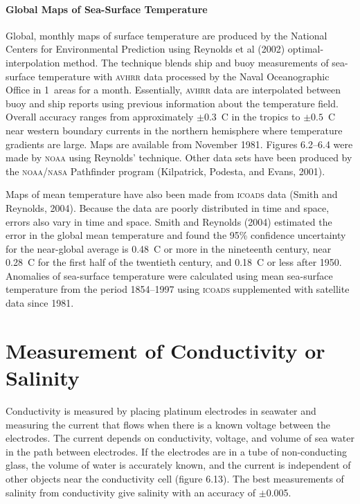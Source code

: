 \paragraph{Global Maps of Sea-Surface Temperature}
Global, monthly maps of surface
temperature are produced by the National Centers for Environmental
Prediction using Reynolds et al (2002) optimal-interpolation
method. The technique blends ship and buoy measurements of sea-surface
temperature with \textsc{avhrr} data processed by the Naval Oceanographic Office
in 1\degrees\ areas for a month. Essentially, \textsc{avhrr} data are
interpolated between buoy and ship reports using previous information
about the temperature field. Overall
accuracy ranges from
approximately $\pm 0.3$\degrees\ C in the tropics to $\pm
0.5$\degrees\ C near western boundary currents in the northern
hemisphere where temperature gradients are large.  Maps are available
from November 1981. Figures 6.2--6.4 were made by \textsc{noaa} using
Reynolds' technique. Other data sets have been produced by the
\textsc{noaa/nasa} Pathfinder program (Kilpatrick, Podesta, and Evans,
2001).

Maps of mean temperature have also been made from \textsc{icoads}
data (Smith and Reynolds, 2004). Because the data are poorly
distributed in time and space, errors also vary in time and
space. Smith and Reynolds (2004) estimated the error in the global
mean temperature and found the 95\% confidence uncertainty for the
near-global average is 0.48\degrees\ C or more in the nineteenth
century, near 0.28\degrees\ C for the first half of the twentieth
century, and 0.18\degrees\ C or less after
1950. Anomalies of
sea-surface temperature were calculated using mean sea-surface
temperature from the period 1854--1997 using
\textsc{icoads} supplemented with satellite data since
1981.

\section{Measurement of Conductivity or Salinity}
Conductivity is measured by placing
platinum electrodes in seawater and measuring the current that flows
when there is a known voltage between the electrodes. The current
depends on conductivity, voltage, and volume of sea water in the path
between electrodes. If the electrodes are in a tube of non-conducting
glass, the volume of water is accurately known, and the current is
independent of other objects near the conductivity cell (figure
6.13). The best measurements of salinity from conductivity give
salinity with an accuracy of $\pm$0.005.

